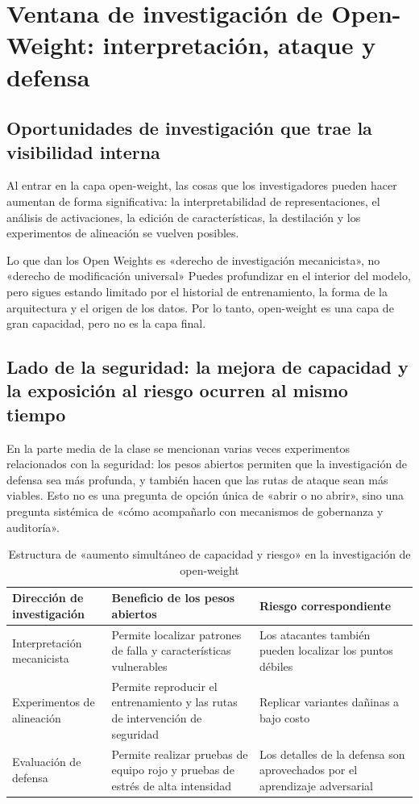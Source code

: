 \section{Ventana de investigación de Open-Weight: interpretación, ataque y defensa}

\subsection{Oportunidades de investigación que trae la visibilidad interna}
Al entrar en la capa open-weight, las cosas que los investigadores pueden hacer aumentan de forma significativa: la interpretabilidad de representaciones, el análisis de activaciones, la edición de características, la destilación y los experimentos de alineación se vuelven posibles.

\begin{importantbox}{Lo que dan los Open Weights es «derecho de investigación mecanicista», no «derecho de modificación universal»}
Puedes profundizar en el interior del modelo, pero sigues estando limitado por el historial de entrenamiento, la forma de la arquitectura y el origen de los datos.  
Por lo tanto, open-weight es una capa de gran capacidad, pero no es la capa final.
\end{importantbox}

\subsection{Lado de la seguridad: la mejora de capacidad y la exposición al riesgo ocurren al mismo tiempo}
En la parte media de la clase se mencionan varias veces experimentos relacionados con la seguridad: los pesos abiertos permiten que la investigación de defensa sea más profunda, y también hacen que las rutas de ataque sean más viables.  
Esto no es una pregunta de opción única de «abrir o no abrir», sino una pregunta sistémica de «cómo acompañarlo con mecanismos de gobernanza y auditoría».

\begin{table}[H]
\centering
\begin{tabular}{p{2.8cm}p{4.0cm}p{4.8cm}}
\toprule
\textbf{Dirección de investigación} & \textbf{Beneficio de los pesos abiertos} & \textbf{Riesgo correspondiente} \\
\midrule
Interpretación mecanicista & Permite localizar patrones de falla y características vulnerables & Los atacantes también pueden localizar los puntos débiles \\
Experimentos de alineación & Permite reproducir el entrenamiento y las rutas de intervención de seguridad & Replicar variantes dañinas a bajo costo \\
Evaluación de defensa & Permite realizar pruebas de equipo rojo y pruebas de estrés de alta intensidad & Los detalles de la defensa son aprovechados por el aprendizaje adversarial \\
\bottomrule
\end{tabular}
\caption{Estructura de «aumento simultáneo de capacidad y riesgo» en la investigación de open-weight}
\end{table}


